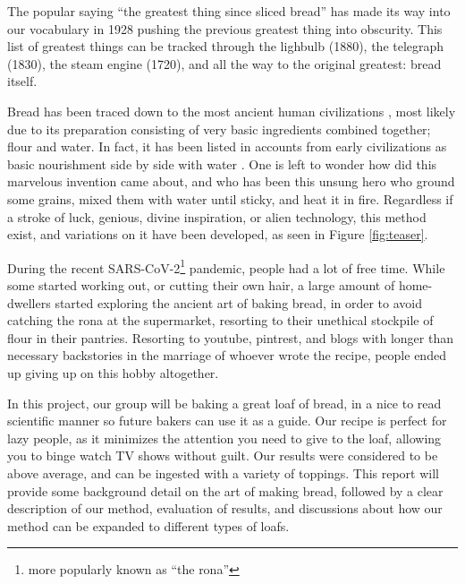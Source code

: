 \documentclass[acmtog, nonacm]{acmart}
\begin{document}
The popular saying ``the greatest thing since sliced bread'' has made its way into our vocabulary in 1928 \cite{slicedBread} pushing the previous greatest thing into obscurity.
This list of greatest things can be tracked through the lighbulb (1880), the telegraph (1830), the steam engine (1720), and all the way to the original greatest: bread itself. 

Bread has been traced down to the most ancient human civilizations \cite{OldBread}, most likely due to its preparation consisting of very basic ingredients combined together; flour and water. 
In fact, it has been listed in accounts from early civilizations as basic nourishment side by side with water \cite{slicedBread,Bible}.
One is left to wonder how did this marvelous invention came about, and who has been this unsung hero who ground some grains, mixed them with water until sticky, and heat it in fire. 
Regardless if a stroke of luck, genious, divine inspiration, or alien technology, this method exist, and variations on it have been developed, as seen in Figure \ref{fig:teaser}. 

During the recent SARS-CoV-2\footnote{more popularly known as ``the rona''} pandemic, people had a lot of free time.
While some started working out, or cutting their own hair, a large amount of home-dwellers started exploring the ancient art of baking bread, in order to avoid catching the rona at the supermarket, resorting to their unethical stockpile of flour in their pantries. 
Resorting to youtube, pintrest, and blogs with longer than necessary backstories in the marriage of whoever wrote the recipe, people ended up giving up on this hobby altogether. 


In this project, our group will be baking a great loaf of bread, in a nice to read scientific manner so future bakers can use it as a guide.
Our recipe is perfect for lazy people, as it minimizes the attention you need to give to the loaf, allowing you to binge watch TV shows without guilt. 
Our results were considered to be above average, and can be ingested with a variety of toppings.
This report will provide some background detail on the art of making bread, followed by a clear description of our method, evaluation of results, and discussions about how our method can be expanded to different types of loafs. 
\end{document}
